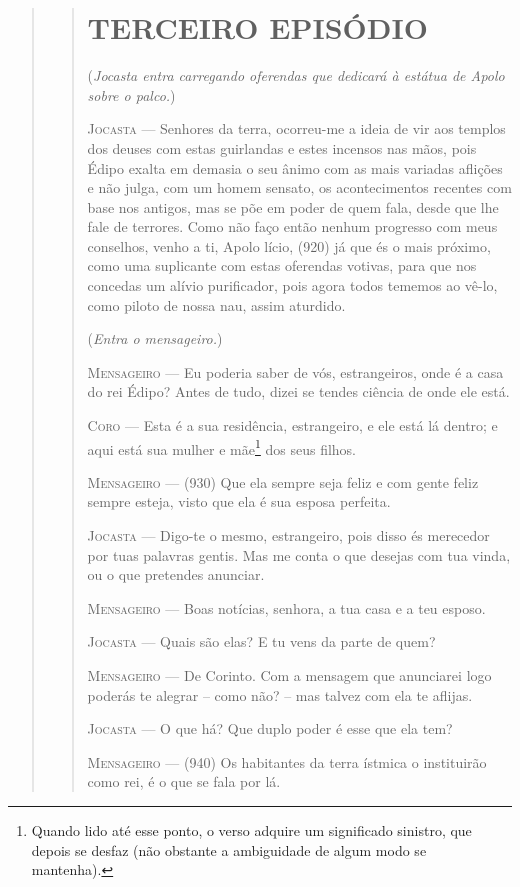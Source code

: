 \begin{verse}
\begin{verse}
\section{TERCEIRO EPISÓDIO}

(\emph{Jocasta entra carregando oferendas que dedicará à estátua de
Apolo sobre o palco.})

\textsc{Jocasta} --- Senhores da terra, ocorreu-me a ideia de vir aos templos dos deuses com
estas guirlandas e estes incensos nas mãos, pois Édipo exalta em demasia
o seu ânimo com as mais variadas aflições e não julga, com um homem
sensato, os acontecimentos recentes com base nos antigos, mas se põe em
poder de quem fala, desde que lhe fale de terrores. Como não faço então
nenhum progresso com meus conselhos, venho a ti, Apolo lício, (920) já
que és o mais próximo, como uma suplicante com estas oferendas votivas,
para que nos concedas um alívio purificador, pois agora todos tememos ao
vê-lo, como piloto de nossa nau, assim aturdido.

(\emph{Entra o mensageiro.})

\textsc{Mensageiro} --- Eu poderia saber de vós, estrangeiros, onde é a casa do rei Édipo? Antes
de tudo, dizei se tendes ciência de onde ele está.

\textsc{Coro} --- Esta é a sua residência, estrangeiro, e ele está lá dentro; e aqui está
sua mulher e mãe\footnote{Quando lido até esse ponto, o verso adquire um
  significado sinistro, que depois se desfaz (não obstante a ambiguidade
  de algum modo se mantenha).} dos seus filhos.

\textsc{Mensageiro} --- (930) Que ela sempre seja feliz e com gente feliz sempre esteja, visto
que ela é sua esposa perfeita.

\textsc{Jocasta} --- Digo-te o mesmo, estrangeiro, pois disso és merecedor por tuas palavras
gentis. Mas me conta o que desejas com tua vinda, ou o que pretendes
anunciar.

\textsc{Mensageiro} --- Boas notícias, senhora, a tua casa e a teu esposo.

\textsc{Jocasta} --- Quais são elas? E tu vens da parte de quem?

\textsc{Mensageiro} --- De Corinto. Com a mensagem que anunciarei logo poderás te alegrar --
como não? -- mas talvez com ela te aflijas.

\textsc{Jocasta} --- O que há? Que duplo poder é esse que ela tem?

\textsc{Mensageiro} --- (940) Os habitantes da terra ístmica o instituirão como rei, é o que se
fala por lá.


\end{verse}
\end{verse}
